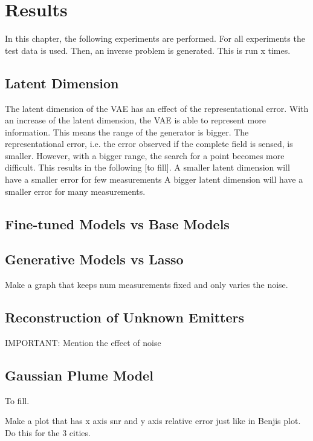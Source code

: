 
\chapter{Results}\label{chapter:results}
In this chapter, the following experiments are performed.
For all experiments the test data is used.
Then, an inverse problem is generated.
This is run x times.

\section{Latent Dimension}
The latent dimension of the VAE has an effect of the representational error.
With an increase of the latent dimension, the VAE is able to represent more information.
This means the range of the generator is bigger.
The representational error, i.e. the error observed if the complete field is sensed, is smaller.
However, with a bigger range, the search for a point becomes more difficult.
This results in the following [to fill].
A smaller latent dimension will have a smaller error for few measurements
A bigger latent dimension will have a smaller error for many measurements.

\section{Fine-tuned Models vs Base Models}
\section{Generative Models vs Lasso}
Make a graph that keeps num measurements fixed and only varies the noise.

\section{Reconstruction of Unknown Emitters}

IMPORTANT:
Mention the effect of noise

\section{Gaussian Plume Model}
To fill.

Make a plot that has x axis snr and y axis relative error just like in Benjis plot.
Do this for the 3 cities.
